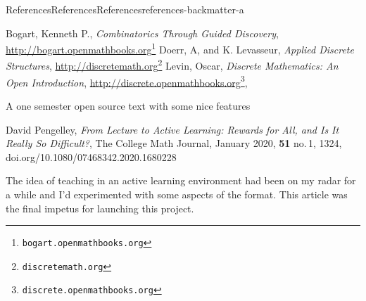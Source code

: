 \documentclass[oneside,10pt,]{book}
\newcommand{\xreffont}{\relax}
\numberwithin{equation}{section}
\begin{document}
\begin{references-chapter-numberless}{References}{References}{}{References}{}{}{references-backmatter-a}
%
\begin{referencelist}
\hypertarget{biblio-biblio-bogart-2017}{}Bogart, Kenneth P., \textit{Combinatorics Through Guided Discovery}, \href{http://bogart.openmathbooks.org}{http:\slash{}\slash{}bogart.openmathbooks.org}\footnote{\nolinkurl{bogart.openmathbooks.org}\label{fn-biblio-bogart-2017-c}}
\hypertarget{biblio-biblio-doerr-2019}{}Doerr, A, and K. Levasseur, \textit{Applied Discrete Structures}, \href{http://discretemath.org}{http:\slash{}\slash{}discretemath.org}\footnote{\nolinkurl{discretemath.org}\label{fn-biblio-doerr-2019-c}}
\hypertarget{biblio-biblio-levin-2020}{}Levin, Oscar, \textit{Discrete Mathematics: An Open Introduction}, \href{http://discrete.openmathbooks.org}{http:\slash{}\slash{}discrete.openmathbooks.org}\footnote{\nolinkurl{discrete.openmathbooks.org}\label{fn-biblio-levin-2020-c}}, \par%
A one semester open source text with some nice features%

\hypertarget{biblio-biblio-pengelley}{}David Pengelley, \textit{From Lecture to Active Learning: Rewards for All, and Is It Really So Difficult?}, The College Math Journal, January 2020, \textbf{51} no.\@\,1, 13\textendash{}24, doi.org\slash{}10.1080\slash{}07468342.2020.1680228\par%
The idea of teaching in an active learning environment had been on my radar for a while and I'd experimented with some aspects of the format. This article was the final impetus for launching this project.%

\end{referencelist}
\end{references-chapter-numberless}
%
{\xreffont\printindex}
%
\end{document}
